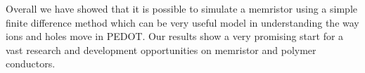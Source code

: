 \begin{doublespace}
Overall we have showed that it is possible to simulate a memristor using a simple finite difference method which can be very useful model in understanding the way ions and holes move in PEDOT. Our results show a very promising start for a vast research and development opportunities on memristor and polymer conductors.

\end{doublespace}

